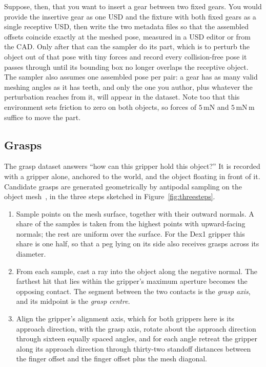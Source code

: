 \documentclass{article}
\begin{document}
Suppose, then, that you want to insert a gear between two fixed gears. You would provide the insertive gear as one USD and the fixture with both fixed gears as a single receptive USD, then write the two metadata files so that the assembled offsets coincide exactly at the meshed pose, measured in a USD editor or from the CAD. Only after that can the sampler do its part, which is to perturb the object out of that pose with tiny forces and record every collision-free pose it passes through until its bounding box no longer overlaps the receptive object. The sampler also assumes one assembled pose per pair: a gear has as many valid meshing angles as it has teeth, and only the one you author, plus whatever the perturbation reaches from it, will appear in the dataset. Note too that this environment sets friction to zero on both objects, so forces of $5$\,mN and $5$\,mN\,m suffice to move the part.

\subsection{Grasps}
\label{sec:grasps}

The grasp dataset answers ``how can this gripper hold this object?'' It is recorded with a gripper alone, anchored to the world, and the object floating in front of it. Candidate grasps are generated geometrically by antipodal sampling on the object mesh~\cite{nguyen1988constructing}, in the three steps sketched in Figure~\ref{fig:threesteps}.
\begin{enumerate}[leftmargin=*, itemsep=2pt]
  \item Sample points on the mesh surface, together with their outward normals. A share of the samples is taken from the highest points with upward-facing normals; the rest are uniform over the surface. For the Dex1 gripper this share is one half, so that a peg lying on its side also receives grasps across its diameter.
  \item From each sample, cast a ray into the object along the negative normal. The farthest hit that lies within the gripper's maximum aperture becomes the opposing contact. The segment between the two contacts is the \emph{grasp axis}, and its midpoint is the \emph{grasp centre}.
  \item Align the gripper's alignment axis, which for both grippers here is its approach direction, with the grasp axis, rotate about the approach direction through sixteen equally spaced angles, and for each angle retreat the gripper along its approach direction through thirty-two standoff distances between the finger offset and the finger offset plus the mesh diagonal.
\end{enumerate}
\end{document}
